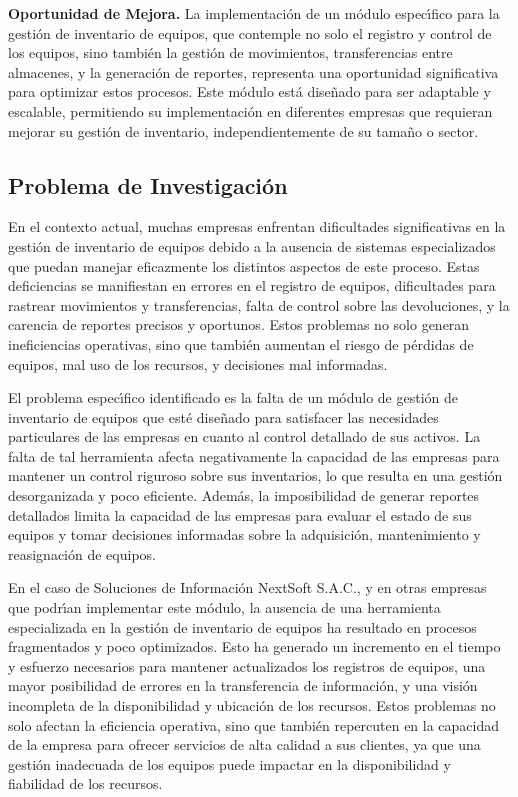\documentclass[stu, 12pt, letterpaper, donotrepeattitle, floatsintext, natbib]{apa7}
\begin{document}
\textbf{Oportunidad de Mejora. }La implementaci\'on de un m\'odulo espec\'{\i}fico para la gesti\'on de inventario de equipos, que contemple no solo el registro y
control de los equipos, sino tambi\'en la gesti\'on de movimientos, transferencias entre almacenes, y la generaci\'on de reportes, representa una oportunidad
significativa para optimizar estos procesos. Este m\'odulo est\'a dise\~{n}ado para ser adaptable y escalable, permitiendo su implementaci\'on en diferentes
empresas que requieran mejorar su gesti\'on de inventario, independientemente de su tama\~{n}o o sector.

\subsection{Problema de Investigaci\'on}
En el contexto actual, muchas empresas enfrentan dificultades significativas en la gesti\'on de inventario de equipos debido a la ausencia de sistemas
especializados que puedan manejar eficazmente los distintos aspectos de este proceso. Estas deficiencias se manifiestan en errores en el registro de equipos,
dificultades para rastrear movimientos y transferencias, falta de control sobre las devoluciones, y la carencia de reportes precisos y oportunos. Estos problemas
no solo generan ineficiencias operativas, sino que tambi\'en aumentan el riesgo de p\'erdidas de equipos, mal uso de los recursos, y decisiones mal informadas.

El problema espec\'{\i}fico identificado es la falta de un m\'odulo de gesti\'on de inventario de equipos que est\'e dise\~{n}ado para satisfacer las necesidades
particulares de las empresas en cuanto al control detallado de sus activos. La falta de tal herramienta afecta negativamente la capacidad de las empresas para
mantener un control riguroso sobre sus inventarios, lo que resulta en una gesti\'on desorganizada y poco eficiente. Adem\'as, la imposibilidad de generar reportes
detallados limita la capacidad de las empresas para evaluar el estado de sus equipos y tomar decisiones informadas sobre la adquisici\'on, mantenimiento y
reasignaci\'on de equipos.

En el caso de Soluciones de Informaci\'on NextSoft S.A.C., y en otras empresas que podr\'{\i}an implementar este m\'odulo, la ausencia de una herramienta
especializada en la gesti\'on de inventario de equipos ha resultado en procesos fragmentados y poco optimizados. Esto ha generado un incremento en el tiempo y
esfuerzo necesarios para mantener actualizados los registros de equipos, una mayor posibilidad de errores en la transferencia de informaci\'on, y una visi\'on
incompleta de la disponibilidad y ubicaci\'on de los recursos. Estos problemas no solo afectan la eficiencia operativa, sino que tambi\'en repercuten en la
capacidad de la empresa para ofrecer servicios de alta calidad a sus clientes, ya que una gesti\'on inadecuada de los equipos puede impactar en la disponibilidad
y fiabilidad de los recursos.
\end{document}
